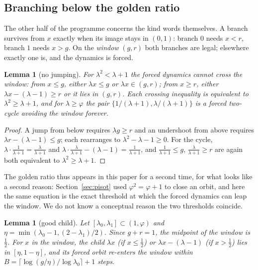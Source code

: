 \documentclass[11pt,reqno]{amsart}
\theoremstyle{plain}
\newtheorem{lemma}[theorem]{Lemma}
\theoremstyle{definition}
\theoremstyle{remark}
\begin{document}
\subsection{Branching below the golden ratio}
The other half of the programme concerns the kind words themselves. A branch
survives from $x$ exactly when its image stays in $(0,1)$: branch $0$ needs
$x<r$, branch $1$ needs $x>g$. On the \emph{window} $(g,r)$ both branches are
legal; elsewhere exactly one is, and the dynamics is forced.

\begin{lemma}[no jumping]\label{lem:nojump}
For $\lambda^2<\lambda+1$ the forced dynamics cannot cross the window: from
$x\leq g$, either $\lambda x\leq g$ or $\lambda x\in(g,r)$; from $x\geq r$,
either $\lambda x-(\lambda-1)\geq r$ or it lies in $(g,r)$. Each crossing
inequality is equivalent to $\lambda^2\geq\lambda+1$, and for
$\lambda\geq\varphi$ the pair $\{1/(\lambda+1),\lambda/(\lambda+1)\}$ is a
forced two-cycle avoiding the window forever.
\end{lemma}

\begin{proof}
A jump from below requires $\lambda g\geq r$ and an undershoot from above
requires $\lambda r-(\lambda-1)\leq g$; each rearranges to
$\lambda^2-\lambda-1\geq0$. For the cycle, $\lambda\cdot\frac1{\lambda+1}
=\frac{\lambda}{\lambda+1}$ and $\lambda\cdot\frac{\lambda}{\lambda+1}
-(\lambda-1)=\frac1{\lambda+1}$, and $\frac1{\lambda+1}\leq g$,
$\frac{\lambda}{\lambda+1}\geq r$ are again both equivalent to
$\lambda^2\geq\lambda+1$.
\end{proof}

The golden ratio thus appears in this paper for a second time, for what looks
like a second reason: Section~\ref{sec:pisot} used $\varphi^2=\varphi+1$ to
close an orbit, and here the same equation is the exact threshold at which the
forced dynamics can leap the window. We do not know a conceptual reason the
two thresholds coincide.

\begin{lemma}[good child]\label{lem:goodchild}
Let $[\lambda_0,\lambda_1]\subset(1,\varphi)$ and
$\eta=\min(\lambda_0-1,(2-\lambda_1)/2)$. Since $g+r=1$, the midpoint of the
window is $\tfrac12$. For $x$ in the window, the child $\lambda x$ (if
$x\leq\tfrac12$) or $\lambda x-(\lambda-1)$ (if $x>\tfrac12$) lies in
$[\eta,1-\eta]$, and its forced orbit re-enters the window within
$B=\lceil\log(g/\eta)/\log\lambda_0\rceil+1$ steps.
\end{lemma}
\end{document}
